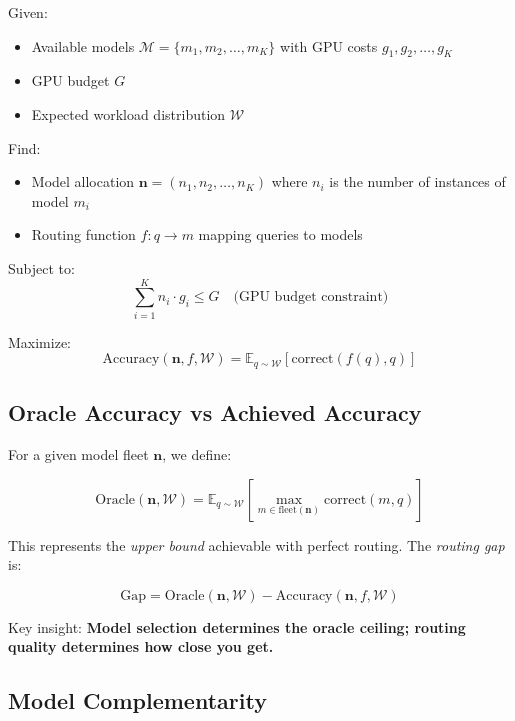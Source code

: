 \documentclass[11pt,a4paper]{article}
\begin{document}
Given:
\begin{itemize}
    \item Available models $\mathcal{M} = \{m_1, m_2, \ldots, m_K\}$ with GPU costs $g_1, g_2, \ldots, g_K$
    \item GPU budget $G$
    \item Expected workload distribution $\mathcal{W}$
\end{itemize}

Find:
\begin{itemize}
    \item Model allocation $\mathbf{n} = (n_1, n_2, \ldots, n_K)$ where $n_i$ is the number of instances of model $m_i$
    \item Routing function $f: q \rightarrow m$ mapping queries to models
\end{itemize}

Subject to:
\begin{equation}
    \sum_{i=1}^{K} n_i \cdot g_i \leq G \quad \text{(GPU budget constraint)}
\end{equation}

Maximize:
\begin{equation}
    \text{Accuracy}(\mathbf{n}, f, \mathcal{W}) = \mathbb{E}_{q \sim \mathcal{W}}[\text{correct}(f(q), q)]
\end{equation}

\subsection{Oracle Accuracy vs Achieved Accuracy}

For a given model fleet $\mathbf{n}$, we define:

\begin{equation}
    \text{Oracle}(\mathbf{n}, \mathcal{W}) = \mathbb{E}_{q \sim \mathcal{W}}[\max_{m \in \text{fleet}(\mathbf{n})} \text{correct}(m, q)]
\end{equation}

This represents the \emph{upper bound} achievable with perfect routing. The \emph{routing gap} is:

\begin{equation}
    \text{Gap} = \text{Oracle}(\mathbf{n}, \mathcal{W}) - \text{Accuracy}(\mathbf{n}, f, \mathcal{W})
\end{equation}

Key insight: \textbf{Model selection determines the oracle ceiling; routing quality determines how close you get.}

\subsection{Model Complementarity}
\end{document}

